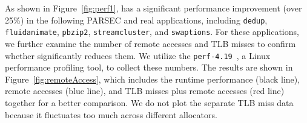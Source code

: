 As shown in Figure~\ref{fig:perf1}, \NM{} has a significant performance improvement (over 25\%) in the following PARSEC and real applications, including \texttt{dedup}, \texttt{fluidanimate}, \texttt{pbzip2}, \texttt{streamcluster}, and \texttt{swaptions}. For these applications, we further examine the number of remote accesses and TLB misses to confirm whether \NM{} significantly reduces them. 
We utilize the \texttt{perf-4.19}~\cite{perfweb}, a Linux performance profiling tool, to collect these numbers. 
The results are shown in Figure~\ref{fig:remoteAccess}, which includes the runtime performance (black line), remote accesses (blue line), and TLB misses plus remote accesses (red line) together for a better comparison. We do not plot the separate TLB miss data because it fluctuates too much across different allocators.

